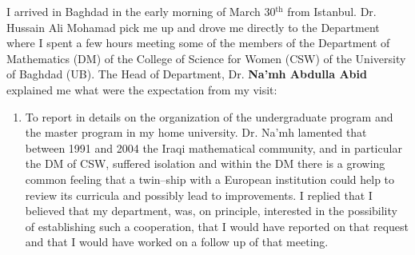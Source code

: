 \documentclass[12pt,a4paper]{scrartcl}
\begin{document}
I arrived in Baghdad in the early morning of March 30$^{\textrm{th}}$ from Istanbul. Dr. {Hussain Ali Mohamad} pick me up and drove me 
directly to the Department where I spent a few hours meeting some of the members of the Department of Mathematics (DM) of the 
College of Science for Women (CSW) of the University of Baghdad (UB). The Head of Department, Dr. \textbf{Na'mh Abdulla Abid} 
explained me what were the expectation from my visit:
\begin{enumerate}
 \item To report in details on the organization of the undergraduate program and the master program in my home university. Dr. Na'mh lamented that
 between 1991 and 2004 the Iraqi mathematical community, and in particular the DM of CSW, suffered isolation and within the DM there is a growing 
common feeling that a twin--ship
 with a European institution could help to review its curricula and possibly lead to improvements. I replied that I believed that my department, was, 
 on principle, interested in the possibility of establishing such a cooperation, that I would have reported on that request and that I would
 have worked on a follow up of that meeting. 


\end{enumerate}
\end{document}
